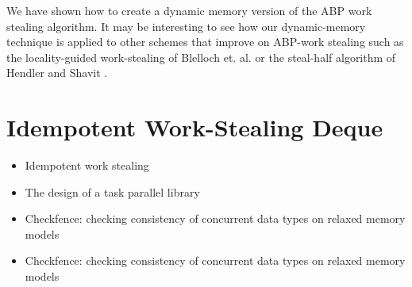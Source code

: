 We have shown how to create a dynamic memory version of the ABP work
stealing algorithm. It may be interesting to see how our
dynamic-memory technique is applied to other schemes that improve on
ABP-work stealing such as the locality-guided work-stealing of
Blelloch et. al. \cite{Acar2002} or the steal-half algorithm of
Hendler and Shavit \cite{Hendler2002}.












\section{Idempotent Work-Stealing Deque}
\label{sec:queues-implementation-idempotent-ws-deque}



\begin{itemize}
\item Idempotent work stealing \cite{Michael2009}
\item The design of a task parallel library \cite{Leijen2009}
\item Checkfence: checking consistency of concurrent data types on
  relaxed memory models \cite{Burckhardt2007}
\item Checkfence: checking consistency of concurrent data types on
  relaxed memory models \cite{Burckhardt2007a}
\end{itemize}

